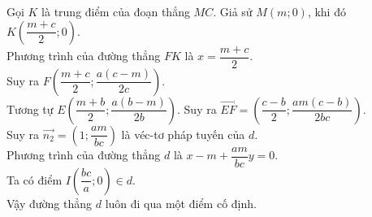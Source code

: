 \begin{bt}
{		Gọi $K$ là trung điểm của đoạn thẳng $MC$. Giả sử $M(m;0)$, khi đó $K\left(\dfrac{m+c}{2};0\right)$.\\
		Phương trình của đường thẳng $FK$ là $x=\dfrac{m+c}{2}$.\\ 
		Suy ra $F\left(\dfrac{m+c}{2};\dfrac{a(c-m)}{2c}\right)$.\\ Tương tự $E\left(\dfrac{m+b}{2};\dfrac{a(b-m)}{2b}\right)$. Suy ra $\overrightarrow{EF}= \left(\dfrac{c-b}{2}; \dfrac{am(c-b)}{2bc}\right)$.\\
		Suy ra $\overrightarrow{n_2}=\left(1;\dfrac{am}{bc}\right)$ là véc-tơ pháp tuyến của $d$.\\
		Phương trình của đường thẳng $d$ là $x-m+\dfrac{am}{bc}y=0$.\\
		Ta có điểm $I\left(\dfrac{bc}{a};0\right)\in d$. \\
		Vậy đường thẳng $d$ luôn đi qua một điểm cố định.
	}
\end{bt}

